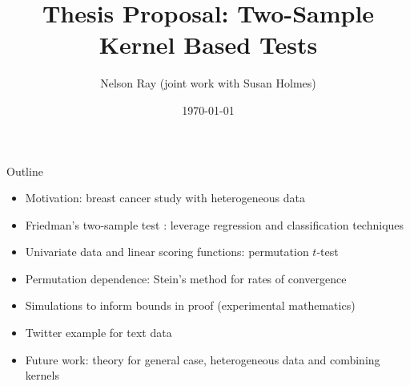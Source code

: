\documentclass{beamer}
\begin{document}
\title[Two-Sample Kernel Tests]{Thesis Proposal: Two-Sample Kernel Based Tests}
\author[N. Ray with S. Holmes]{Nelson Ray (joint work with Susan
  Holmes)}
\date{\today}

\begin{frame}
  \titlepage
\end{frame}


\begin{frame}{Outline}
  \begin{itemize}
  \item Motivation: breast cancer study with heterogeneous data \pause
  \item Friedman's two-sample test \cite{friedman30908multivariate}:
    leverage regression and classification techniques \pause
  \item Univariate data and linear scoring functions: permutation
    $t$-test \pause
  \item Permutation dependence: Stein's method for rates of
    convergence \pause
  \item Simulations to inform bounds in proof (experimental
    mathematics) \pause
  \item Twitter example for text data \pause
  \item Future work: theory for general case, heterogeneous data and
    combining kernels
  \end{itemize}
\end{frame}
\end{document}
